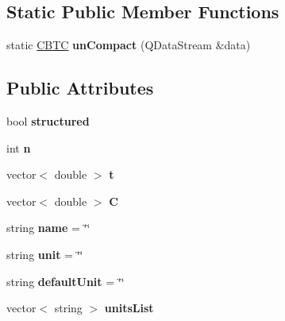 \subsection*{Static Public Member Functions}
\begin{DoxyCompactItemize}
\item 
\mbox{\label{class_c_b_t_c_ad3d9ec0bbe66de71758d6ee95ebcce48}} 
static \hyperlink{class_c_b_t_c}{C\+B\+TC} {\bfseries un\+Compact} (Q\+Data\+Stream \&data)
\end{DoxyCompactItemize}
\subsection*{Public Attributes}
\begin{DoxyCompactItemize}
\item 
\mbox{\label{class_c_b_t_c_a6010c2fbb125c97f2b5687e0337303f6}} 
bool {\bfseries structured}
\item 
\mbox{\label{class_c_b_t_c_a4087b61420470aec1e81f367c6ece7c5}} 
int {\bfseries n}
\item 
\mbox{\label{class_c_b_t_c_a01bcc1565cd2dfd9e1db80c54a428541}} 
vector$<$ double $>$ {\bfseries t}
\item 
\mbox{\label{class_c_b_t_c_abf2e88409feeadae86b0097cce790e5e}} 
vector$<$ double $>$ {\bfseries C}
\item 
\mbox{\label{class_c_b_t_c_a3da708c209bb4047457b19c249adf4d1}} 
string {\bfseries name} = \char`\"{}\char`\"{}
\item 
\mbox{\label{class_c_b_t_c_ad718ebf873865b973359832e3f64da44}} 
string {\bfseries unit} = \char`\"{}\char`\"{}
\item 
\mbox{\label{class_c_b_t_c_a72daf57fda0ba3ff46e1c7ebe28789a9}} 
string {\bfseries default\+Unit} = \char`\"{}\char`\"{}
\item 
\mbox{\label{class_c_b_t_c_a30f8b98682564b4b91d3a98f3c2415b4}} 
vector$<$ string $>$ {\bfseries units\+List}
\item 
\mbox{\label{class_c_b_t_c_adaf566a74d3a3a9cf560ee4d4aaddb03}} 

\end{DoxyCompactItemize}
